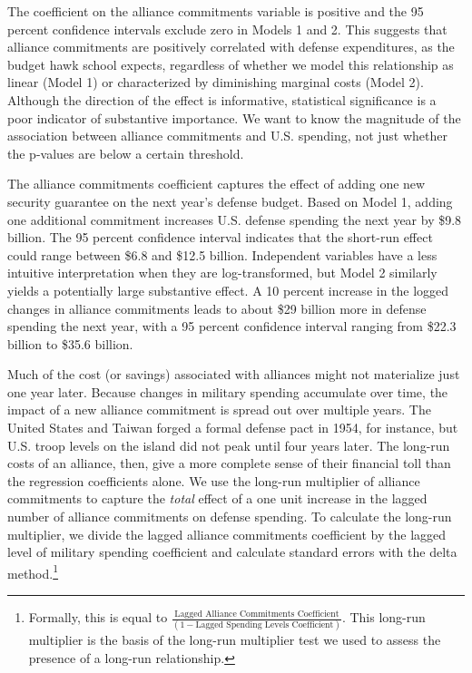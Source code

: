 \documentclass[12pt,hidelinks]{article}
\begin{document}
The coefficient on the alliance commitments variable is positive and the 95 percent confidence intervals exclude zero in Models 1 and 2. 
This suggests that alliance commitments are positively correlated with defense expenditures, as the budget hawk school expects, regardless of whether we model this relationship as linear (Model 1) or characterized by diminishing marginal costs (Model 2). 
Although the direction of the effect is informative, statistical significance is a poor indicator of substantive importance.\autocite{McCaskeyRainey2015}
We want to know the magnitude of the association between alliance commitments and U.S. spending, not just whether the p-values are below a certain threshold. 

The alliance commitments coefficient captures the effect of adding one new security guarantee on the next year's defense budget.
Based on Model 1, adding one additional commitment increases U.S. defense spending the next year by \$9.8 billion.
The 95 percent confidence interval indicates that the short-run effect could range between \$6.8 and \$12.5 billion.
Independent variables have a less intuitive interpretation when they are log-transformed, but Model 2 similarly yields a potentially large substantive effect. 
A 10 percent increase in the logged changes in alliance commitments leads to about \$29 billion more in defense spending the next year, with a 95 percent confidence interval ranging from \$22.3 billion to \$35.6 billion.

Much of the cost (or savings) associated with alliances might not materialize just one year later. 
Because changes in military spending accumulate over time, the impact of a new alliance commitment is spread out over multiple years. 
The United States and Taiwan forged a formal defense pact in 1954, for instance, but U.S. troop levels on the island did not peak until four years later.\autocite{kaneglobal04} 
The long-run costs of an alliance, then, give a more complete sense of their financial toll than the regression coefficients alone. 
We use the long-run multiplier of alliance commitments to capture the \textit{total} effect of a one unit increase in the lagged number of alliance commitments on defense spending. 
To calculate the long-run multiplier, we divide the lagged alliance commitments coefficient by the lagged level of military spending coefficient and calculate standard errors with the delta method.\footnote{Formally, this is equal to $\frac{\mbox{Lagged Alliance Commitments Coefficient}}{(1 - \mbox{Lagged Spending Levels Coefficient})}$. This long-run multiplier is the basis of the long-run multiplier test we used to assess the presence of a long-run relationship.} 
\end{document}
